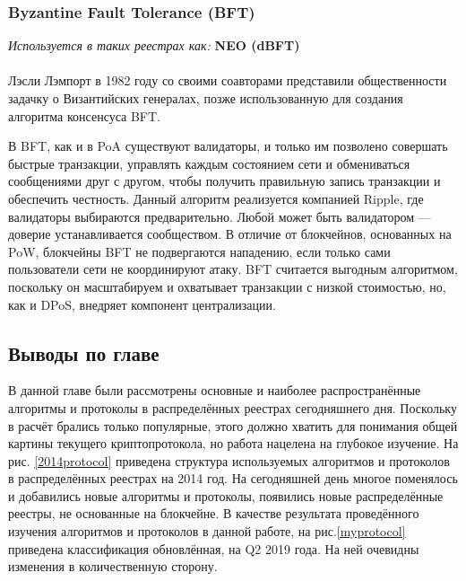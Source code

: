\subsubsection{Byzantine Fault Tolerance (BFT)}
\emph{Используется в таких реестрах как: } \textbf{NEO (dBFT)} \\\\
Лэсли Лэмпорт в 1982 году \cite{Lamport2002} со своими соавторами представили
общественности задачку о Византийских генералах, позже использованную для
создания алгоритма консенсуса BFT.

В BFT, как и в PoA существуют валидаторы, и только им позволено совершать
быстрые транзакции, управлять каждым состоянием сети и обмениваться сообщениями
друг с другом, чтобы получить правильную запись транзакции и обеспечить
честность. Данный алгоритм реализуется компанией Ripple, где валидаторы
выбираются предварительно. Любой может быть валидатором --- доверие
устанавливается сообществом. В отличие от блокчейнов, основанных на PoW,
блокчейны BFT не подвергаются нападению, если только сами пользователи сети не
координируют атаку. BFT считается выгодным алгоритмом, поскольку он
масштабируем и охватывает транзакции с низкой стоимостью, но, как и DPoS,
внедряет компонент централизации.

\subsection{Выводы по главе}
В данной главе были рассмотрены основные и наиболее распространённые алгоритмы
и протоколы в распределённых реестрах сегодняшнего дня. Поскольку в расчёт
брались только популярные, этого должно хватить для понимания общей картины
текущего криптопротокола, но работа нацелена на глубокое изучение. На рис.
\ref{2014protocol} \cite{TimSwanson2014} приведена структура используемых
алгоритмов и протоколов в распределённых реестрах на 2014 год. На сегодняшней
день многое поменялось и добавились новые алгоритмы и протоколы, появились
новые распределённые реестры, не основанные на блокчейне. В качестве
результата проведённого изучения алгоритмов и протоколов в данной работе, на
рис.\ref{myprotocol} приведена классификация обновлённая, на Q2 2019 года. На
ней очевидны изменения в количественную сторону.

\newpage

